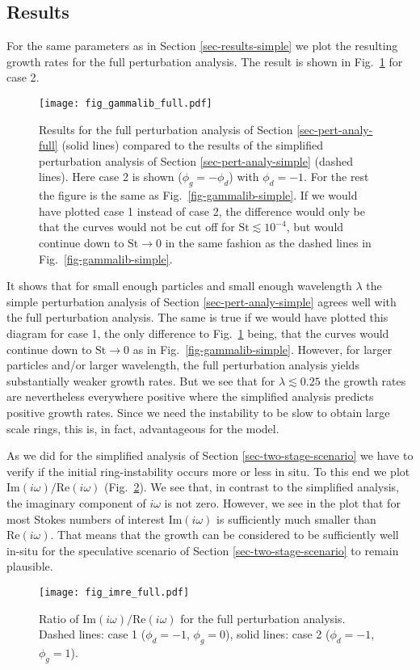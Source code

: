 \documentclass{aa}
\newcommand{\revised}[1]{{#1}}
\begin{document}
\subsection{Results}\label{sec-results-full}
For the same parameters as in Section \ref{sec-results-simple} we
plot the resulting growth rates for the full perturbation analysis.
The result is shown in Fig.~\ref{fig-gammalib-full-simple} \revised{for case 2}.
%
\begin{figure}
  \centerline{\texttt{[image: fig\_gammalib\_full.pdf]}}
  \caption{\label{fig-gammalib-full-simple}Results for the full perturbation
    analysis of Section \ref{sec-pert-analy-full} (solid lines) compared to the
    results of the simplified perturbation analysis of Section
    \ref{sec-pert-analy-simple} (dashed lines). Here case 2 is shown
    ($\phi_g=-\phi_d$) with $\phi_d=-1$. For the rest the figure is the same as
    Fig.~\ref{fig-gammalib-simple}. \revised{If we would have plotted case 1
      instead of case 2, the difference would only be that the curves would not
      be cut off for $\mathrm{St}\lesssim 10^{-4}$, but would continue down to
      $\mathrm{St}\rightarrow 0$ in the same fashion as the dashed lines in
      Fig.~\ref{fig-gammalib-simple}.}}
\end{figure}
%
It shows that for small enough particles and small enough wavelength $\lambda$
the simple perturbation analysis of Section \ref{sec-pert-analy-simple} agrees
well with the full perturbation analysis. \revised{The same is true if we would
  have plotted this diagram for case 1, the only difference to
  Fig.~\ref{fig-gammalib-full-simple} being, that the curves would continue down
  to $\mathrm{St}\rightarrow 0$ as in Fig.~\ref{fig-gammalib-simple}.} However,
for larger particles and/or larger wavelength, the full perturbation analysis
yields substantially weaker growth rates. But we see that for $\lambda\lesssim
0.25$ the growth rates are nevertheless everywhere positive where the simplified
analysis predicts positive growth rates. Since we need the instability to be
slow to obtain large scale rings, this is, in fact, advantageous for the
model.

As we did for the simplified analysis of Section \ref{sec-two-stage-scenario} we
have to verify if the initial ring-instability occurs more or less in situ.  To
this end we plot $\mathrm{Im}(i\omega)/\mathrm{Re}(i\omega)$
(Fig.~\ref{fig-imre-full}). We see that, in contrast to the simplified analysis,
the imaginary component of $i\omega$ is not zero. However, we see in the plot
that for most Stokes numbers of interest $\mathrm{Im}(i\omega)$ is sufficiently
much smaller than $\mathrm{Re}(i\omega)$. That means that the growth can be
considered to be sufficiently well in-situ for the speculative scenario of
Section \ref{sec-two-stage-scenario} to remain plausible.
%
\begin{figure}
  \centerline{\texttt{[image: fig\_imre\_full.pdf]}}
  \caption{\label{fig-imre-full}Ratio of
    $\mathrm{Im}(i\omega)/\mathrm{Re}(i\omega)$ for the full perturbation
    analysis. Dashed lines: case 1 ($\phi_d=-1$, $\phi_g=0$), solid lines: case
    2 ($\phi_d=-1$, $\phi_g=1$).}
\end{figure}
%
\end{document}
